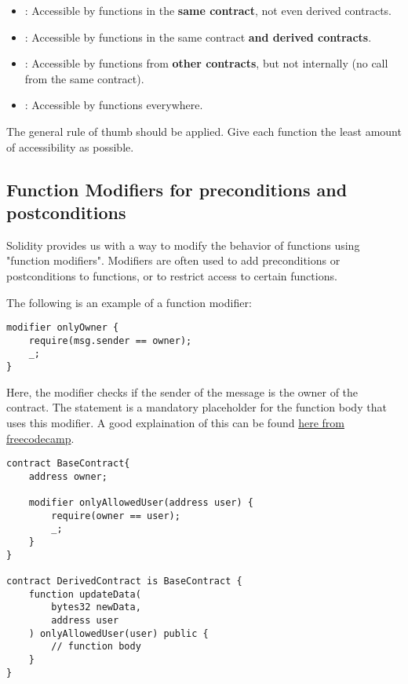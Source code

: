 \begin{itemize}
    \item {}: Accessible by functions in the \textbf{same contract}, not even derived contracts.
    \item {}: Accessible by functions in the same contract \textbf{and derived contracts}.
    \item {}: Accessible by functions from \textbf{other contracts}, but not internally (no call from the same contract).
    \item {}: Accessible by functions everywhere.
\end{itemize}

The general rule of thumb should be applied. Give each function the least amount of accessibility as possible.

\subsection{Function Modifiers for preconditions and postconditions}
Solidity provides us with a way to modify the behavior of functions using "function modifiers". Modifiers are often used to add preconditions or postconditions to functions, or to restrict access to certain functions.

The following is an example of a function modifier:

\begin{lstlisting}[language=Solidity, caption=Solidity isOwner modifier]
modifier onlyOwner {
    require(msg.sender == owner);
    _;
}
\end{lstlisting}

Here, the  modifier checks if the sender of the message is the owner of the contract. The \code{\_;} statement is a mandatory placeholder for the function body that uses this modifier. A good explaination of this can be found \href{https://www.freecodecamp.org/news/what-are-solidity-modifiers/}{here from freecodecamp}.

\label{lst:contract-with-modifiers}
\begin{lstlisting}[language=Solidity, caption=Contract with modifiers]
contract BaseContract{
    address owner;

    modifier onlyAllowedUser(address user) {
        require(owner == user);
        _;
    }
}

contract DerivedContract is BaseContract {
    function updateData(
        bytes32 newData, 
        address user
    ) onlyAllowedUser(user) public {
        // function body
    }
}
\end{lstlisting}

